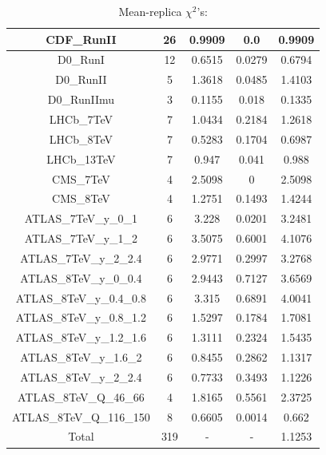 \documentclass[
]{article}
\begin{document}
\begin{table}[h]
\begin{tabular}{|c|c|c|c|c|}
CDF\_RunII & 26 & 0.9909 & 0.0 & 0.9909 \\ \hline
D0\_RunI & 12 & 0.6515 & 0.0279 & 0.6794 \\ \hline
D0\_RunII & 5 & 1.3618 & 0.0485 & 1.4103 \\ \hline
D0\_RunIImu & 3 & 0.1155 & 0.018 & 0.1335 \\ \hline
LHCb\_7TeV & 7 & 1.0434 & 0.2184 & 1.2618 \\ \hline
LHCb\_8TeV & 7 & 0.5283 & 0.1704 & 0.6987 \\ \hline
LHCb\_13TeV & 7 & 0.947 & 0.041 & 0.988 \\ \hline
CMS\_7TeV & 4 & 2.5098 & 0 & 2.5098 \\ \hline
CMS\_8TeV & 4 & 1.2751 & 0.1493 & 1.4244 \\ \hline
ATLAS\_7TeV\_y\_0\_1 & 6 & 3.228 & 0.0201 & 3.2481 \\ \hline
ATLAS\_7TeV\_y\_1\_2 & 6 & 3.5075 & 0.6001 & 4.1076 \\ \hline
ATLAS\_7TeV\_y\_2\_2.4 & 6 & 2.9771 & 0.2997 & 3.2768 \\ \hline
ATLAS\_8TeV\_y\_0\_0.4 & 6 & 2.9443 & 0.7127 & 3.6569 \\ \hline
ATLAS\_8TeV\_y\_0.4\_0.8 & 6 & 3.315 & 0.6891 & 4.0041 \\ \hline
ATLAS\_8TeV\_y\_0.8\_1.2 & 6 & 1.5297 & 0.1784 & 1.7081 \\ \hline
ATLAS\_8TeV\_y\_1.2\_1.6 & 6 & 1.3111 & 0.2324 & 1.5435 \\ \hline
ATLAS\_8TeV\_y\_1.6\_2 & 6 & 0.8455 & 0.2862 & 1.1317 \\ \hline
ATLAS\_8TeV\_y\_2\_2.4 & 6 & 0.7733 & 0.3493 & 1.1226 \\ \hline
ATLAS\_8TeV\_Q\_46\_66 & 4 & 1.8165 & 0.5561 & 2.3725 \\ \hline
ATLAS\_8TeV\_Q\_116\_150 & 8 & 0.6605 & 0.0014 & 0.662 \\ \hline
Total & 319 & - & - & 1.1253 \\ \hline

\end{tabular}

\caption{Mean-replica \(\chi^2\)'s:}

\end{table}
\end{document}
